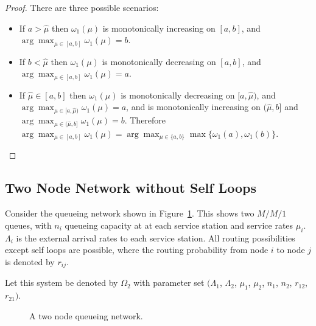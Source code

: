 \documentclass{article}
\begin{document}
\begin{proof}
There are three possible scenarios:
\begin{itemize}
\item If $a > \hat{\mu}$ then $\omega_1(\mu)$ is monotonically increasing on $[a, b]$, and $\arg\max_{\mu \in [a, b]} \omega_1(\mu) = b$.
\item If $b < \hat{\mu}$ then $\omega_1(\mu)$ is monotonically decreasing on $[a, b]$, and $\arg\max_{\mu \in [a, b]} \omega_1(\mu) = a$.
\item If $\hat{\mu} \in [a, b]$ then $\omega_1(\mu)$ is monotonically decreasing on $[a, \hat{\mu})$, and $\arg\max_{\mu \in [a, \hat{\mu})} \omega_1(\mu) = a$, and is monotonically increasing on $(\hat{\mu}, b]$ and $\arg\max_{\mu \in (\hat{\mu}, b]} \omega_1(\mu) = b$. Therefore $\arg\max_{\mu \in [a, b]} \omega_1(\mu) = \arg\max_{\mu \in \{a, b\}} \max \{\omega_1(a), \omega_1(b) \}$.
\end{itemize}
\end{proof}

\subsection{Two Node Network without Self Loops}\label{sec:2nodewithoutselfloops}
Consider the queueing network shown in Figure~\ref{fig:queueingnetwork_2nodes}.
This shows two \(M/M/1\) queues, with \(n_i\) queueing capacity at at each service station and service rates $\mu_i$.
$\Lambda_i$ is the external arrival rates to each service station.
All routing possibilities except self loops are possible, where the routing probability from node $i$ to node $j$ is denoted by $r_{ij}$.

Let this system be denoted by $\Omega_2$ with parameter set $(\Lambda_1$, $\Lambda_2$, $\mu_1$, $\mu_2$, $n_1$, $n_2$, $r_{12}$, $r_{21})$.

\begin{figure}[!htbp]
  
  \caption{A two node queueing network.}
  \label{fig:queueingnetwork_2nodes}
\end{figure}
\end{document}
